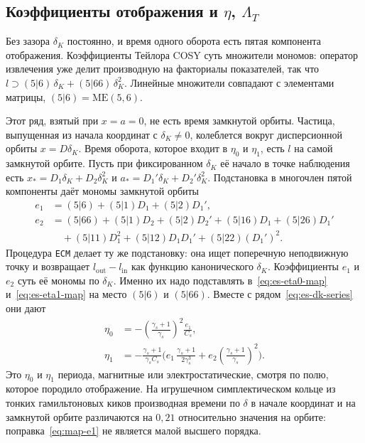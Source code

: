 \subsection{Коэффициенты отображения и $\eta$, $\Lambda_T$}
\label{sec:map-coef}

Без зазора $\delta_K$ постоянно, и время одного оборота есть пятая компонента отображения. Коэффициенты Тейлора COSY суть множители мономов: оператор извлечения уже делит производную на факториалы показателей, так что $l\supset(5|6)\,\delta_K+(5|66)\,\delta_K^2$. Линейные множители совпадают с элементами матрицы, $(5|6)=\mathrm{ME}(5,6)$.

Этот ряд, взятый при $x=a=0$, не есть время замкнутой орбиты. Частица, выпущенная из начала координат с $\delta_K\neq 0$, колеблется вокруг дисперсионной орбиты $x=D\delta_K$. Время оборота, которое входит в $\eta_0$ и $\eta_1$, есть $l$ на самой замкнутой орбите. Пусть при фиксированном $\delta_K$ её начало в точке наблюдения есть $x_*=D_1\delta_K+D_2\delta_K^2$ и $a_*=D_1'\delta_K+D_2'\delta_K^2$. Подстановка в многочлен пятой компоненты даёт мономы замкнутой орбиты
\begin{align}
e_1
&=
(5|6)+(5|1)D_1+(5|2)D_1',
\label{eq:map-e1}\\
e_2
&=
(5|66)+(5|1)D_2+(5|2)D_2'
+(5|16)D_1+(5|26)D_1'
\nonumber\\
&\quad
+(5|11)D_1^2+(5|12)D_1 D_1'+(5|22)(D_1')^2.
\label{eq:map-e2}
\end{align}
Процедура \texttt{ECM} делает ту же подстановку: она ищет поперечную неподвижную точку и возвращает $l_{\mathrm{out}}-l_{\mathrm{in}}$ как функцию канонического $\delta_K$. Коэффициенты $e_1$ и $e_2$ суть её мономы по $\delta_K$. Именно их надо подставлять в~\eqref{eq:es-eta0-map} и~\eqref{eq:es-eta1-map} на место $(5|6)$ и $(5|66)$. Вместе с рядом~\eqref{eq:es-dk-series} они дают
\begin{align}
\eta_0
&=
-\left(\frac{\gamma_s+1}{\gamma_s}\right)^2\frac{e_1}{C_s},
\label{eq:map-eta0}\\
\eta_1
&=
-\frac{\gamma_s+1}{\gamma_s C_s}
\Biggl(
e_1\,\frac{\gamma_s+1}{2\gamma_s^3}
+e_2\left(\frac{\gamma_s+1}{\gamma_s}\right)^2
\Biggr).
\label{eq:map-eta1}
\end{align}
Это $\eta_0$ и $\eta_1$ периода, магнитные или электростатические, смотря по полю, которое породило отображение. На игрушечном симплектическом кольце из тонких гамильтоновых киков производная времени по $\delta$ в начале координат и на замкнутой орбите различаются на $0{,}21$ относительно значения на орбите: поправка~\eqref{eq:map-e1} не является малой высшего порядка.

